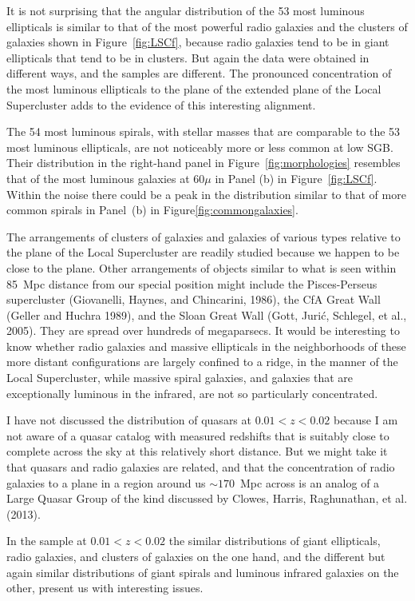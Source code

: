 \documentclass[fleqn,12pt]{article}
\begin{document}
It is not surprising that the angular distribution of the 53 most luminous ellipticals is similar to that of the most powerful radio galaxies and the clusters of galaxies shown in Figure~\ref{fig:LSCf}, because radio galaxies tend to be in giant ellipticals that tend to be in clusters. But again the data were obtained in different ways, and the samples are different. The pronounced concentration of the most luminous ellipticals to the plane of the extended plane of the Local Supercluster adds to the evidence of this interesting alignment. 

The 54 most luminous spirals, with stellar masses that are comparable to the 53 most luminous ellipticals, are not noticeably more or less common at low SGB. Their distribution in the right-hand panel in Figure~\ref{fig:morphologies} resembles that of the most luminous galaxies at $60\mu$ in Panel (b) in Figure~\ref{fig:LSCf}. Within the noise there could be a peak in the distribution similar to that of more common spirals in Panel~(b) in Figure\ref{fig:commongalaxies}.

The arrangements of  clusters of galaxies and galaxies of various types relative to the plane of the Local Supercluster are readily studied because we happen to be close to the plane. Other arrangements of objects similar to what is seen within 85~Mpc distance from our special position might include the Pisces-Perseus supercluster (Giovanelli, Haynes, and Chincarini, 1986), the CfA Great Wall (Geller and Huchra 1989), and the Sloan Great Wall (Gott, Juri{\'c}, Schlegel, et al., 2005). They are spread over hundreds of megaparsecs. It would be interesting to know whether radio galaxies and massive ellipticals in the neighborhoods of these more distant configurations are largely confined to a ridge, in the manner of the Local Supercluster, while massive spiral galaxies, and galaxies that are exceptionally luminous in the infrared, are not so particularly concentrated. 

I have not discussed the distribution of quasars at $0.01<z<0.02$ because I am not aware of a quasar catalog with measured redshifts that is suitably close to complete across the sky at this relatively short distance. But we might take it that quasars and radio galaxies are related, and that the concentration of radio galaxies to a plane in a region around us $\sim 170$~Mpc across is an analog of a Large Quasar Group of the kind discussed by Clowes, Harris, Raghunathan, et al. (2013). 

In the sample at $0.01 < z < 0.02$ the similar distributions of giant ellipticals, radio galaxies, and clusters of galaxies on the one  hand, and the different but again similar distributions of giant spirals and luminous infrared galaxies on the other, present us with interesting issues.
\end{document}
